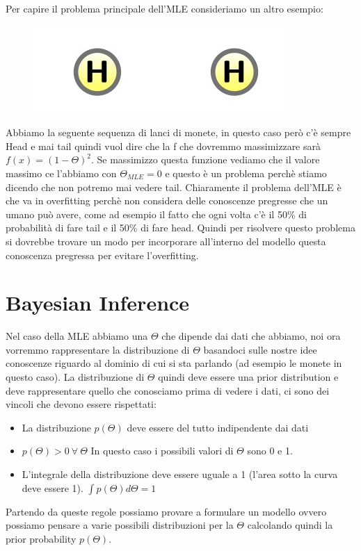 \documentclass[14pt]{extreport}
\begin{document}
Per capire il problema principale dell'MLE consideriamo un altro esempio:
\begin{figure}[H]
\centering
\includegraphics[width=0.3\linewidth]{27.jpeg}
\end{figure}
Abbiamo la seguente sequenza di lanci di monete, in questo caso però c'è sempre Head e mai tail quindi vuol dire che la f che dovremmo massimizzare
sarà $f(x)=(1-\Theta)^2$. Se massimizzo questa funzione vediamo che il valore massimo ce l'abbiamo con $\Theta_{MLE} = 0$ e questo è un problema
perchè stiamo dicendo che non potremo mai vedere tail. Chiaramente il problema dell'MLE è che va in overfitting perchè non considera delle conoscenze
pregresse che un umano può avere, come ad esempio il fatto che ogni volta c'è il 50\% di probabilità di fare tail e il 50\% di fare head. Quindi per
risolvere questo problema si dovrebbe trovare un modo per incorporare all'interno del modello questa conoscenza pregressa per evitare l'overfitting.


\section{Bayesian Inference}

Nel caso della MLE abbiamo una $\Theta$ che dipende dai dati che abbiamo, noi ora vorremmo rappresentare la distribuzione di $\Theta$ basandoci sulle
nostre idee conoscenze riguardo al dominio di cui si sta parlando (ad esempio le monete in questo caso). La distribuzione di $\Theta$ quindi deve
essere una prior distribution e deve rappresentare quello che conosciamo prima di vedere i dati, ci sono dei vincoli che devono essere rispettati:
\begin{itemize}
\item La distribuzione $p(\Theta)$ deve essere del tutto indipendente dai dati
\item $p(\Theta)>0 \ \forall \ \Theta$ In questo caso i possibili valori di $\Theta$ sono 0 e 1.
\item L'integrale della distribuzione deve essere uguale a 1 (l'area sotto la curva deve essere 1). $\int p(\Theta) d\Theta = 1$
\end{itemize}

Partendo da queste regole possiamo provare a formulare un modello ovvero possiamo pensare a varie possibili distribuzioni per la $	\Theta$ calcolando
quindi la prior probability $p(\Theta)$.
\end{document}
